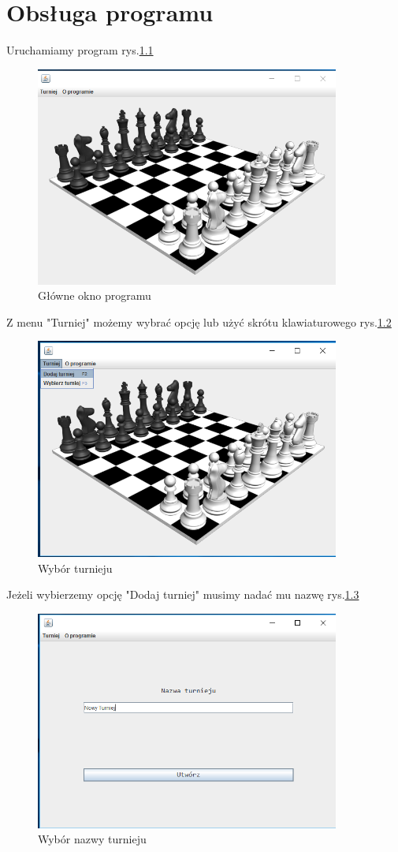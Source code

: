 \chapter{Obsługa programu}
Uruchamiamy program rys.\ref{fig:glowne_okno_programu}
\begin{figure}[H]
	\centering
	\includegraphics[width=10cm]{fig/1}
	\caption{Główne okno programu}
	\label {fig:glowne_okno_programu} 
\end{figure}
Z menu "Turniej" możemy wybrać opcję lub użyć skrótu klawiaturowego rys.\ref{fig:wybor_turnieju}
\begin{figure}[H]
	\centering
	\includegraphics[width=10cm]{fig/2}
	\caption{Wybór turnieju}
	\label {fig:wybor_turnieju} 
\end{figure}
Jeżeli wybierzemy opcję "Dodaj turniej" musimy nadać mu nazwę rys.\ref{fig:wybor_nazwy_turnieju}
\begin{figure}[H]
	\centering
	\includegraphics[width=10cm]{fig/3}
	\caption{Wybór nazwy turnieju}
	\label {fig:wybor_nazwy_turnieju} 
\end{figure}
